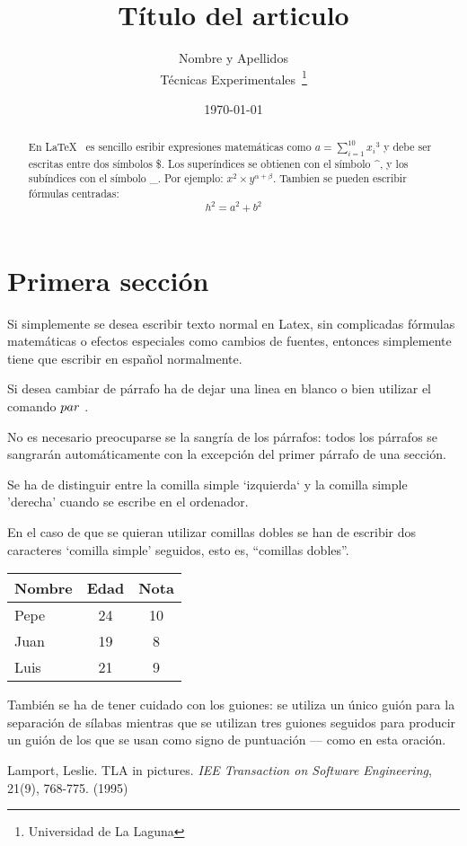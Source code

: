 \documentclass[a4paper,12pt]{article}
\begin{document}
\title{Título del articulo}
\author{Nombre y Apellidos\\
	Técnicas Experimentales~\footnote{Universidad de La Laguna}
	}
\date{\today}
\maketitle

\begin{abstract}
  En \LaTeX{}~\cite{Lam:86} es sencillo esribir expresiones
  matemáticas como $a=\sum_{i=1}^{10} {x_i}^{3}$
  y debe ser escritas entre dos símbolos \$.
  Los superíndices se obtienen con el símbolo \^{}, y
  los subíndices con el símbolo \_.
  Por ejemplo: $x^2 \times y^{\alpha + \beta}$.
  Tambien se pueden escribir fórmulas centradas:
  \[h^2=a^2 + b^2 \]
\end{abstract}

\section{Primera sección}
Si simplemente se desea escribir texto normal en Latex,
sin complicadas f\'ormulas matem\'aticas o efectos especiales
como cambios de fuentes, entonces simplemente tiene que escribir
en espa\~nol normalmente.\par
Si desea cambiar de párrafo ha de dejar una linea en blanco o bien
utilizar el comando $\\par$ .

No es necesario preocuparse se la sangría de los párrafos:
todos los párrafos se sangrarán automáticamente con la excepción
del primer párrafo de una sección.

Se ha de distinguir entre la comilla simple `izquierda`
y la comilla simple 'derecha' cuando se escribe en el ordenador.

En el caso de que se quieran utilizar comillas dobles se han de 
escribir dos caracteres `comilla simple' seguidos, esto es, 
``comillas dobles''.

\bigskip
 \begin{tabular}{|l|c|c|}
 \hline
 Nombre & Edad & Nota \\ \hline
 Pepe & 24 & 10 \\ \hline
 Juan & 19 & 8 \\ \hline
 Luis & 21 & 9 \\ \hline
 \end{tabular}

 También se ha de tener cuidado con los guiones: se utiliza un único
guión para la separación de sílabas mientras que se utilizan
tres guiones seguidos para producir un guión de los que se usan
como signo de puntuación --- como en esta oración.

\begin{thebibliography}{00}
    Lamport, Leslie.
    TLA in pictures.
    \emph{IEE Transaction on Software Engineering},
    21(9), 768-775.
    (1995)
\end{thebibliography}   
\end{document}
